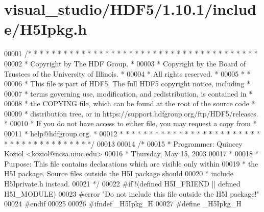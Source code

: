 \hypertarget{visual__studio_2_h_d_f5_21_810_81_2include_2_h5_ipkg_8h_source}{}\section{visual\+\_\+studio/\+H\+D\+F5/1.10.1/include/\+H5\+Ipkg.h}
\label{visual__studio_2_h_d_f5_21_810_81_2include_2_h5_ipkg_8h_source}

\begin{DoxyCode}
00001 \textcolor{comment}{/* * * * * * * * * * * * * * * * * * * * * * * * * * * * * * * * * * * * * * *}
00002 \textcolor{comment}{ * Copyright by The HDF Group.                                               *}
00003 \textcolor{comment}{ * Copyright by the Board of Trustees of the University of Illinois.         *}
00004 \textcolor{comment}{ * All rights reserved.                                                      *}
00005 \textcolor{comment}{ *                                                                           *}
00006 \textcolor{comment}{ * This file is part of HDF5.  The full HDF5 copyright notice, including     *}
00007 \textcolor{comment}{ * terms governing use, modification, and redistribution, is contained in    *}
00008 \textcolor{comment}{ * the COPYING file, which can be found at the root of the source code       *}
00009 \textcolor{comment}{ * distribution tree, or in https://support.hdfgroup.org/ftp/HDF5/releases.  *}
00010 \textcolor{comment}{ * If you do not have access to either file, you may request a copy from     *}
00011 \textcolor{comment}{ * help@hdfgroup.org.                                                        *}
00012 \textcolor{comment}{ * * * * * * * * * * * * * * * * * * * * * * * * * * * * * * * * * * * * * * */}
00013 
00014 \textcolor{comment}{/*}
00015 \textcolor{comment}{ * Programmer:  Quincey Koziol <koziol@ncsa.uiuc.edu>}
00016 \textcolor{comment}{ *      Thursday, May 15, 2003}
00017 \textcolor{comment}{ *}
00018 \textcolor{comment}{ * Purpose: This file contains declarations which are visible only within}
00019 \textcolor{comment}{ *      the H5I package.  Source files outside the H5I package should}
00020 \textcolor{comment}{ *      include H5Iprivate.h instead.}
00021 \textcolor{comment}{ */}
00022 \textcolor{preprocessor}{#if !(defined H5I\_FRIEND || defined H5I\_MODULE)}
00023 \textcolor{preprocessor}{#error "Do not include this file outside the H5I package!"}
00024 \textcolor{preprocessor}{#endif}
00025 
00026 \textcolor{preprocessor}{#ifndef \_H5Ipkg\_H}
00027 \textcolor{preprocessor}{#define \_H5Ipkg\_H}

\end{DoxyCode}
